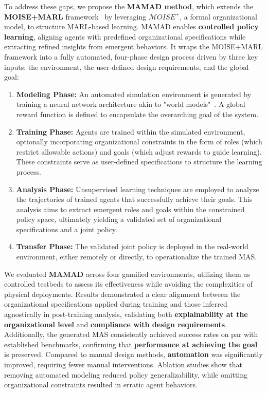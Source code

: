 \documentclass[pdflatex,sn-mathphys-num]{sn-jnl}%
\theoremstyle{thmstyleone}%
\theoremstyle{thmstyletwo}%
\theoremstyle{thmstylethree}%
\begin{document}
To address these gaps, we propose the \textbf{MAMAD method}, which extends the \textbf{MOISE+MARL} framework~\cite{soule2025moisemarl} by leveraging \textbf{$\mathcal{M}OISE^+$}, a formal organizational model, to structure MARL-based learning. MAMAD enables \textbf{controlled policy learning}, aligning agents with predefined organizational specifications while extracting refined insights from emergent behaviors. It wraps the MOISE+MARL framework into a fully automated, four-phase design process driven by three key inputs: the environment, the user-defined design requirements, and the global goal:
%
\begin{enumerate}
  \item \textbf{Modeling Phase:} An automated simulation environment is generated by training a neural network architecture akin to "world models"~\cite{Ha2018}. A global reward function is defined to encapsulate the overarching goal of the system.
  \item \textbf{Training Phase:} Agents are trained within the simulated environment, optionally incorporating organizational constraints in the form of roles (which restrict allowable actions) and goals (which adjust rewards to guide learning). These constraints serve as user-defined specifications to structure the learning process.
  \item \textbf{Analysis Phase:} Unsupervised learning techniques are employed to analyze the trajectories of trained agents that successfully achieve their goals. This analysis aims to extract emergent roles and goals within the constrained policy space, ultimately yielding a validated set of organizational specifications and a joint policy.
  \item \textbf{Transfer Phase:} The validated joint policy is deployed in the real-world environment, either remotely or directly, to operationalize the trained MAS.
\end{enumerate}
%
We evaluated \textbf{MAMAD} across four gamified environments, utilizing them as controlled testbeds to assess its effectiveness while avoiding the complexities of physical deployments. Results demonstrated a clear alignment between the organizational specifications applied during training and those inferred agnostically in post-training analysis, validating both \textbf{explainability at the organizational level} and \textbf{compliance with design requirements}. Additionally, the generated MAS consistently achieved success rates on par with established benchmarks, confirming that \textbf{performance at achieving the goal} is preserved. Compared to manual design methods, \textbf{automation} was significantly improved, requiring fewer manual interventions. Ablation studies show that removing automated modeling reduced policy generalizability, while omitting organizational constraints resulted in erratic agent behaviors.
\end{document}
